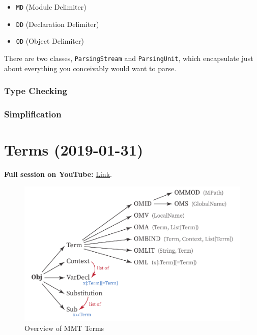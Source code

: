 \documentclass[11pt,a4paper]{article}
\newcommand{\MMT}{\textsf{MMT}\xspace}
\begin{document}
\begin{itemize}
\item \texttt{MD} (Module Delimiter)
\item \texttt{DD} (Declaration Delimiter)
\item \texttt{OD} (Object Delimiter)
\end{itemize}

There are two classes, \texttt{ParsingStream} and \texttt{ParsingUnit}, which encapsulate just about everything you conceivably would want to parse.
\subsubsection{Type Checking}
\subsubsection{Simplification}

\newpage
\section{Terms (2019-01-31)}
\label{sec:terms}

\textbf{Full session on YouTube:} \href{https://www.youtube.com/watch?v=vtePl2pGhfc}{Link}.
\bigskip

\begin{figure}[ht]
\includegraphics[scale=1]{mmt-terms.pdf}
\caption{Overview of \MMT Terms}
\label{fig:mmtterms}
\end{figure}
\end{document}
